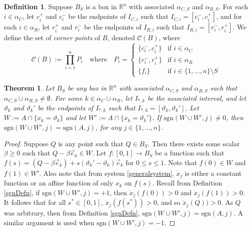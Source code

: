 \documentclass[12pt]{article}
\newtheorem{theorem}{Theorem}[section]
\theoremstyle{definition}
\newtheorem{defn}{Definition}[section]
\theoremstyle{remark}
\newcommand\sgn{\text{sgn}}
\newcommand{\cC}{\mathcal{C}}
\newcommand{\bbR}{\mathbb{R}} %
\begin{document}
\begin{defn}
Suppose $B_S$ is a box in $\bbR^n$ with associated $\alpha_{C,S}$ and $\alpha_{R,S}$.  For each $i\in\alpha_C$, let $c_i^+$ and $c_i^-$ be the endpoints of $I_{C,i}$ such that $I_{C,i}=[c_i^-,c_i^+]$, and for each $i\in\alpha_R$, let $r_i^+$ and $r_i^-$ be the endpoints of $I_{R,i}$ such that $I_{R,i}=[r_i^-,r_i^+]$. We define the set of \textit{corner points} of $B$, denoted $\cC(B)$, where
\begin{equation*}
\cC(B):=\prod_{i=1}^n P_i \quad \text{where} \quad P_i=\begin{cases}
\{c_i^-,c_i^+\} &	\text{if } i\in\alpha_C \\
\{r_i^-,r_i^+\} &	\text{if } i\in\alpha_R \\
\{f_i\} 		&	\text{if } i\in \{1,\dots,n\}\setminus S
\end{cases}
\end{equation*}
\end{defn}

\begin{theorem} \label{straightlineproof}
Let $B_S$ be any box in $\bbR^n$ with associated $\alpha_{C,S}$ and $\alpha_{R,S}$ such that $\alpha_{C,S} \cup \alpha_{R,S} \neq \emptyset$. For some $k\in \alpha_C \cup \alpha_R$, let $I_{*,k}$ be the associated interval, and let $\vartheta_k$ and $\vartheta_k'$ be the endpoints of $I_{*,k}$ such that $I_{*,k}=[\vartheta_k,\vartheta_k']$. Let $W:=A\cap \{x_k=\vartheta_k\}$ and let $W':=A\cap \{x_k=\vartheta_k'\}$. If $\sgn(W\cup W',j)\neq 0$, then $\sgn(W\cup W',j)=\sgn(A,j)$, for any $j\in\{1,\dots,n\}$.
\end{theorem}

\begin{proof}
Suppose $Q$ is any point such that $Q\in B_S$. Then there exists some scalar $\beta\geq 0$ such that $Q-\beta \vec e_k\in W$. Let $f:[0,1]\to B_S$ be a function such that $f(s)=(Q-\beta \vec e_k) + s(\vartheta_k'-\vartheta_k) \vec e_k$ for $0\leq s \leq 1$. Note that $f(0)\in W$ and $f(1)\in W'$. Also note that from system \eqref{generalsystem}, $\dot x_j$ is either a constant function or an affine function of only $x_k$ on $f(s)$. Recall from Definition \ref{sgnDefn}, if $\sgn(W\cup W',j)=+1$, then $\dot x_j (f(0))>0$ and $\dot x_j (f(1))>0$. It follows that for all $s^*\in [0,1]$, $\dot x_j (f(s^*))>0$, and so  $\dot x_j (Q))>0$. As $Q$ was arbitrary, then from Definition \ref{sgnDefn}, $\sgn(W\cup W',j)=\sgn(A,j)$. A similar argument is used when $\sgn(W \cup W',j)=-1$.
\end{proof}
\end{document}
